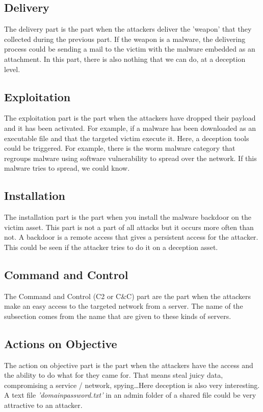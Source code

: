 \documentclass{tnreport}
\begin{document}
\subsection{Delivery}
The delivery part is the part when the attackers deliver the 'weapon' that they collected during the previous part. If the weapon is a malware, the delivering process could be sending a mail to the victim with the malware embedded as an attachment. In this part, there is also nothing that we can do, at a deception level.

\subsection{Exploitation}
The exploitation part is the part when the attackers have dropped their payload and it has been activated. For example, if a malware has been downloaded as an executable file and that the targeted victim execute it. Here, a deception tools could be triggered. For example, there is the worm malware category that regroups malware using software vulnerability to spread over the network. If this malware tries to spread, we could know.

\subsection{Installation}
The installation part is the part when you install the malware backdoor on the victim asset. This part is not a part of all attacks but it occurs more often than not. A backdoor is a remote access that gives a persistent access for the attacker. This could be seen if the attacker tries to do it on a deception asset.

\subsection{Command and Control}
The Command and Control (\gls{C2} or C\&C) part are the part when the attackers make an easy access to the targeted network from a server. The name of the subsection comes from the name that are given to these kinds of servers.

\subsection{Actions on Objective}
The action on objective part is the part when the attackers have the access and the ability to do what for they came for. That means steal juicy data, compromising a service / network, spying\ldots Here deception is also very interesting. A text file \textit{'domainpassword.txt'} in an admin folder of a shared file could be very attractive to an attacker.
\end{document}
